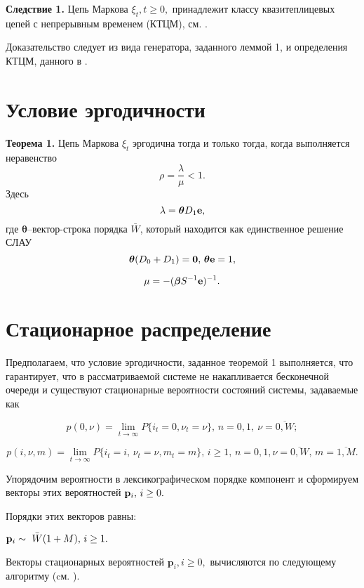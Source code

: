\documentclass[12pt,a4paper]{article}
\newcommand{\bs}{\boldsymbol}
\begin{document}
{\bf Следствие  1.}
  Цепь Маркова  $\xi_t, t \geq 0,$ принадлежит классу квазитеплицевых цепей с непрерывным временем (КТЦМ), см.  
  \cite{kd}.


Доказательство  следует из вида генератора, заданного леммой  1,  и определения КТЦМ, данного в \cite{kd}.



\section{Условие эргодичности }


{\bf Теорема  1.}
  Цепь Маркова $\xi_t$ эргодична тогда и только тогда, когда выполняется неравенство
$$
\rho=\frac{\lambda}{\mu}<1.
$$
Здесь
$$
\lambda =\bs\theta D_1 {\bf e},
$$
где $\bs\theta$--вектор-строка порядка $\bar{W}$, который находится как единственное решение СЛАУ
$$
\bs\theta (D_0+D_1)= {\bf 0},\, \bs\theta{\bf e} = 1,
$$

$$
\mu=-(\bs{\beta}S^{-1}{\bf e})^{-1}.
$$







\section{ Стационарное распределение }

Предполагаем, что условие эргодичности, заданное теоремой 1 выполняется, что гарантирует, что в рассматриваемой системе 
не накапливается бесконечной очереди и существуют
стационарные вероятности состояний системы, задаваемые как

\begin{equation*}
 p (0,\nu)=\lim\limits_{t \to \infty} P\{i_t=0,\nu_t=\nu\},\,n=0,1,\
 \nu=\overline{0,W};
    \end{equation*}



 $$
  p (i,  \nu, m)=\lim\limits_{t \to \infty} P\{i_t=i,\, \nu_t=\nu, m_t=m\},\,
    i\geq1,\, n=0,1, \nu=\overline{0,W}, \,m=\overline{1,M}.
    $$

 Упорядочим вероятности в  лексикографическом порядке компонент и сформируем векторы этих вероятностей
${\bf p}_i, \,i\geq0.$

Порядки этих векторов равны:

${\bf p}_i\sim\,\, \bar{W}(1+M),\,i\geq1.$



Векторы стационарных вероятностей $\mathbf{p}_i, i\geq0,$
вычисляются по следующему алгоритму (cм. \cite{kd}).
\end{document}
